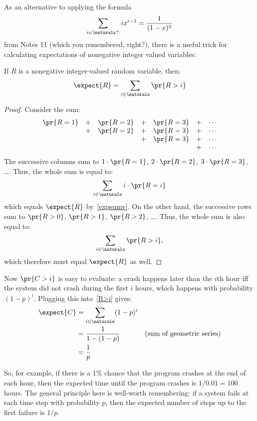 As an alternative to applying the formula
\begin{equation}\label{Notes11form}
\sum_{i \in \naturals^{+}} ix^{i-1} =\frac{1}{(1-x)^2}
\end{equation}
from Notes 11 (which you remembered, right?), there is a useful trick for
calculating expectations of nonegative integer valued variables:
\begin{lemma}
If $R$ is a nonegative integer-valued random variable, then:
%
\begin{equation}\label{R>i}
\expect{R} = \sum_{i \in \naturals} \pr{R > i}
\end{equation}
\end{lemma}

\begin{proof}
Consider the sum:
%
\[
\begin{array}{ccccccc}
\pr{R = 1} & + & \pr{R = 2} & + & \pr{R = 3} & + & \cdots \\
           & + & \pr{R = 2} & + & \pr{R = 3} & + & \cdots \\
           &   &            & + & \pr{R = 3} & + & \cdots \\
           &   &            &   &            & + & \cdots
\end{array}
\]
%
The successive columns sum to $1 \cdot \pr{R = 1}$, $2 \cdot \pr{R = 2}$,
$3 \cdot \pr{R = 3}$, \dots.  Thus, the whole sum is equal to:
%
\[
\sum_{i \in \naturals} i \cdot \pr{R = i}
\]
which equals $\expect{R}$ by~\eqref{expsumv}.  On the other hand, the
successive rows sum to $\pr{R > 0}$, $\pr{R > 1}$, $\pr{R > 2}$, \dots.
Thus, the whole sum is also equal to:
%
\[
\sum_{i \in \naturals} \pr{R > i},
\]
%
which therefore must equal $\expect{R}$ as well.
\end{proof}

Now $\pr{C > i}$ is easy to evaluate: a crash happens later than the $i$th
hour iff the system did not crash during the first $i$ hours, which
happens with probability $(1-p)^i$.  Plugging this into~\eqref{R>i} gives:
%
\begin{align*}
\expect{C} & = \sum_{i \in \naturals} (1-p)^i \\
       & = \frac{1}{1 - (1-p)} & \text{(sum of geometric series)}\\
       & = \frac{1}{p}
\end{align*}

So, for example, if there is a 1\% chance that the program crashes at
the end of each hour, then the expected time until the program crashes
is $1 / 0.01 = 100$ hours.  The general principle here is well-worth
remembering: if a system fails at each time step with probability $p$,
then the expected number of steps up to the first failure is $1 / p$.


